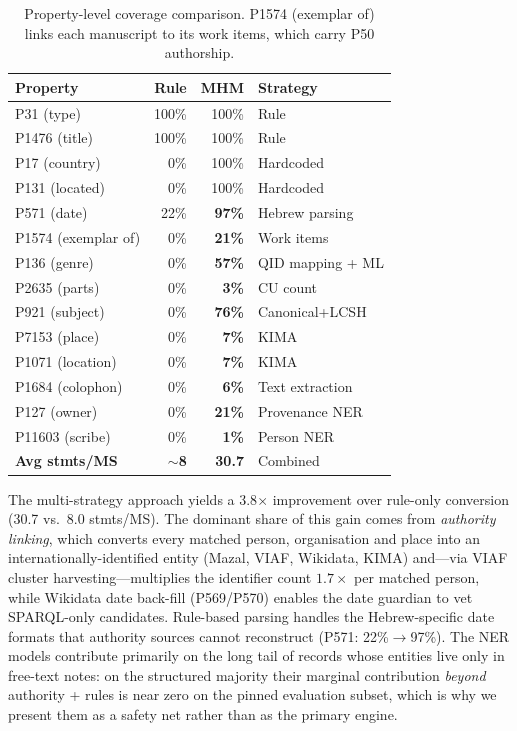 \documentclass[Afour,sageh,times]{sagej}
\begin{document}
\begin{table}[t]
\caption{Property-level coverage comparison. P1574 (exemplar of) links each manuscript to its work items, which carry P50 authorship.}
\label{tab:coverage}
\centering
\footnotesize
\setlength{\tabcolsep}{3.5pt}
\begin{tabular}{lrrl}
\toprule
\textbf{Property} & \textbf{Rule} & \textbf{MHM} & \textbf{Strategy} \\
\midrule
P31 (type)       & 100\% & 100\%        & Rule \\
P1476 (title)    & 100\% & 100\%        & Rule \\
P17 (country)    & 0\%   & 100\%        & Hardcoded \\
P131 (located)   & 0\%   & 100\%        & Hardcoded \\
P571 (date)      & 22\%  & \textbf{97\%}& Hebrew parsing \\
P1574 (exemplar of) & 0\% & \textbf{21\%}& Work items \\
P136 (genre)     & 0\%   & \textbf{57\%}& QID mapping + ML \\
P2635 (parts)    & 0\%   & \textbf{3\%}& CU count \\
P921 (subject)   & 0\%   & \textbf{76\%}& Canonical+LCSH \\
P7153 (place)    & 0\%   & \textbf{7\%}& KIMA \\
P1071 (location) & 0\%   & \textbf{7\%}& KIMA \\
P1684 (colophon) & 0\%   & \textbf{6\%}& Text extraction \\
P127 (owner)     & 0\%   & \textbf{21\%}& Provenance NER \\
P11603 (scribe)  & 0\%   & \textbf{1\%}& Person NER \\
\midrule
\textbf{Avg stmts/MS} & \textbf{$\sim$8} & \textbf{30.7} & Combined \\
\bottomrule
\end{tabular}
\end{table}

The multi-strategy approach yields a 3.8$\times$ improvement over rule-only conversion (30.7 vs.\ 8.0 stmts/MS). The dominant share of this gain comes from \emph{authority linking}, which converts every matched person, organisation and place into an internationally-identified entity (Mazal, VIAF, Wikidata, KIMA) and---via VIAF cluster harvesting---multiplies the identifier count $1.7\times$ per matched person, while Wikidata date back-fill (P569/P570) enables the date guardian to vet SPARQL-only candidates. Rule-based parsing handles the Hebrew-specific date formats that authority sources cannot reconstruct (P571: 22\%$\to$97\%). The NER models contribute primarily on the long tail of records whose entities live only in free-text notes: on the structured majority their marginal contribution \emph{beyond} authority + rules is near zero on the pinned evaluation subset, which is why we present them as a safety net rather than as the primary engine.
\end{document}
